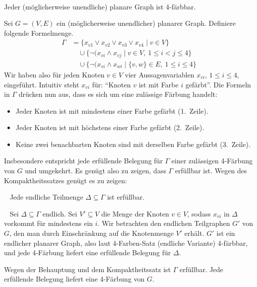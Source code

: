 \documentclass[fontsize=11pt, twoside=false, numbers=autoenddot]{scrbook}
\begin{document}
 \\
Jeder (möglicherweise unendliche) planare Graph ist 4-färbbar.

\par\noindent
\begin{beweis}
  Sei $G=(V,E)$ ein (möglicherweise unendlicher) planarer Graph.
  Definiere folgende Formelmenge.
  \begin{align*}
    \Gamma & = \{x_{v1} \lor x_{v2} \lor x_{v3} \lor x_{v4} \mid v \in V\} \\
           & \quad \cup \{\lnot (x_{vi} \land x_{vj} \mid v \in V,~ 1 \leq i < j \leq 4\} \\
           & \quad \cup \{\lnot (x_{vi} \land x_{wi} \mid \{v,w\} \in E,~ 1 \leq i \leq 4\}
  \end{align*}
  Wir haben also für jeden Knoten $v \in V$ vier Aussagenvariablen $x_{vi}$, $1 \leq i \leq 4$, eingeführt.
  Intuitiv steht $x_{vi}$ für: "`Knoten $v$ ist mit Farbe $i$ gefärbt"'.
  Die Formeln in $\Gamma$ drücken nun aus, dass es sich um eine zulässige Färbung handelt:
  \begin{itemize}
    \item
      Jeder Knoten ist mit mindestens einer Farbe gefärbt (1.\ Zeile).
    \item
      Jeder Knoten ist mit höchstens einer Farbe gefärbt (2.\ Zeile).
    \item
      Keine zwei benachbarten Knoten sind mit derselben Farbe gefärbt (3.\ Zeile).
  \end{itemize}
  Insbesondere entspricht jede erfüllende Belegung für $\Gamma$ einer zulässigen 4-Färbung von $G$ und umgekehrt.
  Es genügt also zu zeigen, dass $\Gamma$ erfüllbar ist.
  Wegen des Kompaktheitssatzes genügt es zu zeigen:

  \par\smallskip\noindent
  ~
  Jede endliche Teilmenge $\Delta \subseteq \Gamma$ ist erfüllbar.

  \par\smallskip\noindent
  ~
  Sei $\Delta \subseteq \Gamma$ endlich.
  Sei $V' \subseteq V$ die Menge der Knoten $v \in V$,
  sodass $x_{vi}$ in $\Delta$ vorkommt für mindestens ein $i$.
  Wir betrachten den endlichen Teilgraphen $G'$ von $G$,
  den man durch Einschränkung auf die Knotenmenge $V'$ erhält.
  $G'$ ist ein endlicher planarer Graph,
  also laut 4-Farben-Satz (endliche Variante) 4-färbbar,
  und jede 4-Färbung liefert eine erfüllende Belegung für $\Delta$.
  
  \par\smallskip\noindent
  Wegen der Behauptung und dem Kompaktheitssatz ist $\Gamma$ erfüllbar.
  Jede erfüllende Belegung liefert eine 4-Färbung von $G$.  
  \qedhere
\end{beweis}%
\end{document}
